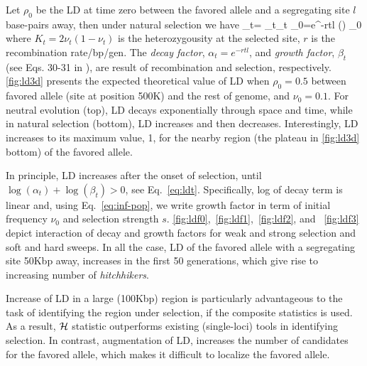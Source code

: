 {Let $\rho_0$ be the LD at time zero between the favored allele and a 
segregating site $l$ base-pairs away, then under natural selection we have
\beq
\rho_t= \alpha_t\beta_t \rho_0=e^{-rtl} \left(\right)  
\rho_0\label{eq:ldt}
\eeq
where $K_t=2\nu_t(1-\nu_t)$ is the heterozygousity at the selected site, $r$ is 
the recombination rate/bp/gen. The 
\emph{decay factor}, $\alpha_t=e^{-rtl}$,
and \emph{growth factor}, $\beta_t$ (see Eqs. 30-31 in 
\cite{stephan2006hitchhiking}), are result of recombination and 
selection, respectively. \ref{fig:ld3d} presents the expected theoretical 
value of LD when $\rho_0=0.5$ between favored allele (site at position 500K) 
and the rest of 
genome, and $\nu_0=0.1$. For neutral evolution (top), LD decays exponentially 
through space and time, while in natural selection (bottom), LD increases and 
then decreases. Interestingly, LD increases to its maximum value, 1, for the 
nearby region (the plateau in \ref{fig:ld3d} bottom) of the favored 
allele.

In principle, LD increases after the onset of selection, until $\log(\alpha_t) 
+\log(\beta_t) 
>0$, see Eq.~\ref{eq:ldt}. 
Specifically, log of decay term is linear and, using 
Eq.~\ref{eq:inf-pop}, we write growth 
factor in term of initial frequency $\nu_0$ and selection strength $s$. 
\ref{fig:ldf0},~\ref{fig:ldf1},~\ref{fig:ldf2}, and ~\ref{fig:ldf3} 
depict interaction of 
decay and growth factors for weak and 
strong selection and soft and hard sweeps. In all the case, LD of the 
favored allele with a segregating site 50Kbp away, increases in the first 50 
generations, which give rise to increasing number of \emph{hitchhikers}. 

Increase of LD in a large (100Kbp) region is particularly advantageous to the 
task of identifying the region under selection, if the composite statistics is 
used. As a result, ${\cal H}$ statistic outperforms existing (single-loci) tools in 
identifying selection. In contrast, augmentation of LD, increases the 
number 
of candidates for 
the favored allele, which makes it difficult to localize the favored 
allele.
}
